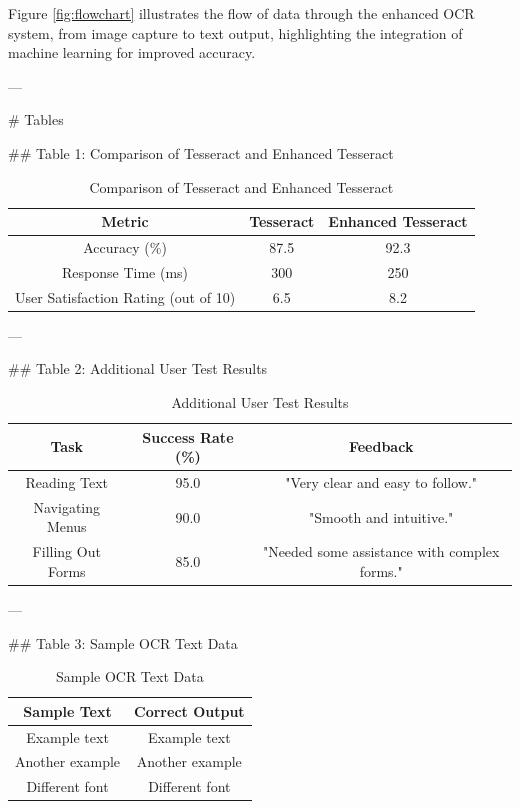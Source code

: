Figure \ref{fig:flowchart} illustrates the flow of data through the enhanced OCR system, from image capture to text output, highlighting the integration of machine learning for improved accuracy.

---

# Tables

## Table 1: Comparison of Tesseract and Enhanced Tesseract

\begin{table}[ht]
\centering
\begin{tabular}{|c|c|c|}
\hline
\textbf{Metric} & \textbf{Tesseract} & \textbf{Enhanced Tesseract} \\
\hline
Accuracy (\%) & 87.5 & 92.3 \\
\hline
Response Time (ms) & 300 & 250 \\
\hline
User Satisfaction Rating (out of 10) & 6.5 & 8.2 \\
\hline
\end{tabular}
\caption{Comparison of Tesseract and Enhanced Tesseract}
\label{tab:results}
\end{table}

---

## Table 2: Additional User Test Results

\begin{table}[ht]
\centering
\begin{tabular}{|c|c|c|}
\hline
\textbf{Task} & \textbf{Success Rate (\%)} & \textbf{Feedback} \\
\hline
Reading Text & 95.0 & "Very clear and easy to follow." \\
\hline
Navigating Menus & 90.0 & "Smooth and intuitive." \\
\hline
Filling Out Forms & 85.0 & "Needed some assistance with complex forms." \\
\hline
\end{tabular}
\caption{Additional User Test Results}
\label{tab:additional_results}
\end{table}

---

## Table 3: Sample OCR Text Data

\begin{table}[ht]
\centering
\begin{tabular}{|c|c|}
\hline
\textbf{Sample Text} & \textbf{Correct Output} \\
\hline
Example text & Example text \\
\hline
Another example & Another example \\
\hline
Different font & Different font \\
\hline
\end{tabular}
\caption{Sample OCR Text Data}
\label{tab:text_data}
\end{table}

